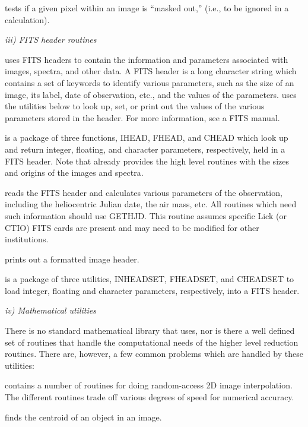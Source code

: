 \hhang
{}tests if a given pixel within an
image is ``masked out,'' (i.e., to be ignored in a calculation). 

\Sskip
\centerline  {\it iii) FITS header routines\rm }

\vskip 0.125in
	\V uses FITS headers to contain the information and
parameters associated with images, spectra, and other data. A
FITS header is a long character string which contains a set of
keywords to identify various parameters, such as the size of an
image, its label, date of observation, etc., and the values of
the parameters.  \V uses the utilities below to look up, set, or
print out the values of the various parameters stored in the
header. For more information, see a FITS manual. 

\hhang
{}is a package of three functions,
IHEAD, FHEAD, and CHEAD which look up and return integer, floating,
and character parameters, respectively,  held in a FITS header.  Note
that \V already provides the high level routines with the sizes and
origins of the images and spectra. 

\hhang
{}reads the FITS header and 
calculates various parameters of the observation, including the
heliocentric Julian date, the air mass, etc.  All routines which
need such information should use GETHJD.
This routine assumes specific Lick (or CTIO) FITS cards are present
and may need to be modified for other institutions.

\hhang
{}prints out a formatted image 
header.

\hhang
{}is a package of three utilities,
INHEADSET, FHEADSET, and CHEADSET to load integer, floating and
character parameters, respectively, into a FITS header. 

\Sskip
\centerline  {\it iv) Mathematical utilities\rm }

\vskip 0.125in
	There is no standard mathematical library that \V uses, nor is
there a well defined set of routines that handle the computational
needs of the higher level reduction routines.  There are, however, a
few common problems which are handled by these utilities: 

\hhang
{}contains a number of routines for
doing random-access 2D image interpolation.  The different routines
trade off various degrees of speed for numerical accuracy. 

\hhang
{}finds the centroid of an object
in an image. 

